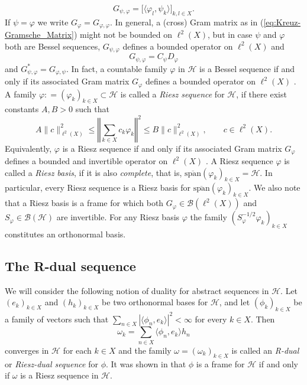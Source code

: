 \documentclass{amsart}
\def\Hil{\mathcal{H}}
\newcommand{\B}[0]{{\mathcal{B}}}
\renewcommand{\H}{{\mathcal{H}}}
\begin{document}
\begin{equation}\label{eq:Kreuz-Gramsche_Matrix}
G_{\psi,\varphi}  = \big[ \langle \varphi_{l} , \psi_k \rangle \big]_{k,l \in X}.
\end{equation}
If $\psi=\varphi$ we write $G_\varphi=G_{\varphi,\varphi}$. In general, a (cross) Gram matrix as in (\ref{eq:Kreuz-Gramsche_Matrix}) might not be bounded on $\ell^2(X)$, but in case $\psi$ and $\varphi$ both are Bessel sequences, $G_{\psi,\varphi}$ defines a bounded operator on $\ell^2(X)$ and 
$$G_{\psi,\varphi}=C_\psi D_\varphi $$
and $G_{\psi,\varphi}^\ast=G_{\varphi,\psi}$. 
In fact, a countable family $\varphi$ in $\Hil$ is a Bessel sequence if and only if its associated Gram matrix $G_{\varphi}$ defines a bounded operator on $\ell^2(X)$ \cite{xxlstoeant11}. A family $\varphi : = (\varphi_k )_{k \in X}\subset \H$   is called a \emph{Riesz sequence} for $\H$, if there exist constants $A,B>0$ such that
$$A\|c\|_{\ell^2(X)}^2\leq \left\Vert \sum_{k\in X}c_k\varphi_k\right\Vert^2\leq B\|c\|_{\ell^2(X)}^2, \qquad  c\in \ell^2(X).$$
Equivalently, $\varphi$ is a Riesz sequence if and only if its associated Gram matrix $G_{\varphi}$ defines a bounded and invertible operator on $\ell^2(X)$ \cite{xxlstoeant11}. A Riesz sequence $\varphi$ is called a \emph{Riesz basis}, if it is also \emph{complete}, that is, $\overline{\text{span}}(\varphi_k)_{k\in X} = \H$. In particular, every Riesz sequence is a Riesz basis for $\overline{\text{span}}(\varphi_k)_{k\in X}$. We also note that a Riesz basis is a frame for which both $G_{\varphi}\in \B(\ell^2(X))$ and $S_{\varphi}\in \B(\Hil)$ are invertible. For any Riesz basis $\varphi$ the family $(S_\varphi^{-1/2}\varphi_k)_{k\in X}$ constitutes an orthonormal basis. 

\subsection{The R-dual sequence}

We will consider the following notion of duality for abstract sequences in $\H$. Let $(e_k)_{k\in X}$ and $(h_k)_{k\in X}$ be two orthonormal bases for $\H$, and let $(\phi_k)_{k\in X}$ be a family of vectors such that $\sum_{n\in X} |\langle \phi_n,e_k\rangle |^2<\infty$ for every $k\in X$.
Then 
\begin{equation}\label{Rdual0}
\omega_k=\sum_{n\in X}\langle \phi_n,e_k\rangle h_n
\end{equation}
converges in $\Hil$ for each $k\in X$ and the family $\omega = (\omega_k)_{k\in X}$ is called an 
\emph{R-dual} or \emph{Riesz-dual sequence} for $\phi$. It was shown in \cite[Propositions 10,11]{Casazza2004} that $\phi$ is a frame for $\H$ if and only if $\omega$ is a Riesz sequence in $\Hil$.
\end{document}

